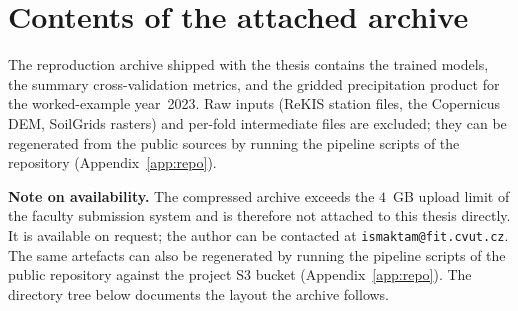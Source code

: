 \chapter{Contents of the attached archive}
\label{app:archive}

The reproduction archive shipped with the thesis contains the trained
models, the summary cross-validation metrics, and the gridded precipitation
product for the worked-example year~2023. Raw inputs (ReKIS station files,
the Copernicus DEM, SoilGrids rasters) and per-fold intermediate files are
excluded; they can be regenerated from the public sources by running the
pipeline scripts of the repository (Appendix~\ref{app:repo}).

\medskip\noindent\textbf{Note on availability.} The compressed archive
exceeds the $4$~GB upload limit of the faculty submission system and is
therefore not attached to this thesis directly. It is available on request;
the author can be contacted at \texttt{ismaktam@fit.cvut.cz}. The same
artefacts can also be regenerated by running the pipeline scripts of the
public repository against the project S3 bucket (Appendix~\ref{app:repo}).
The directory tree below documents the layout the archive follows.

